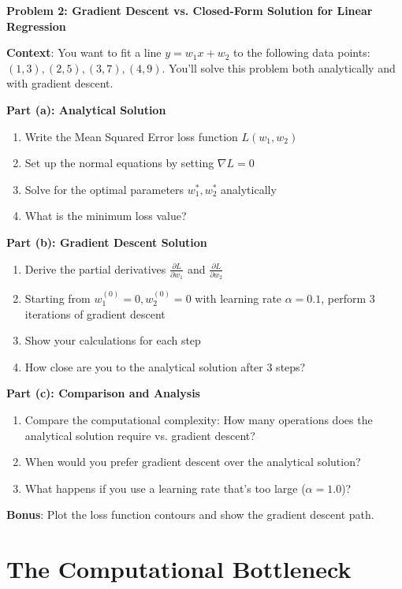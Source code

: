 \documentclass[11pt]{article}
\begin{document}
\begin{homeworkbox}
\textbf{Problem 2: Gradient Descent vs. Closed-Form Solution for Linear Regression}

\textbf{Context}: You want to fit a line $y = w_1 x + w_2$ to the following data points: $(1, 3), (2, 5), (3, 7), (4, 9)$. You'll solve this problem both analytically and with gradient descent.

\textbf{Part (a): Analytical Solution}
\begin{enumerate}
\item Write the Mean Squared Error loss function $L(w_1, w_2)$
\item Set up the normal equations by setting $\nabla L = 0$
\item Solve for the optimal parameters $w_1^*, w_2^*$ analytically
\item What is the minimum loss value?
\end{enumerate}

\textbf{Part (b): Gradient Descent Solution}
\begin{enumerate}
\item Derive the partial derivatives $\frac{\partial L}{\partial w_1}$ and $\frac{\partial L}{\partial w_2}$
\item Starting from $w_1^{(0)} = 0, w_2^{(0)} = 0$ with learning rate $\alpha = 0.1$, perform 3 iterations of gradient descent
\item Show your calculations for each step
\item How close are you to the analytical solution after 3 steps?
\end{enumerate}

\textbf{Part (c): Comparison and Analysis}
\begin{enumerate}
\item Compare the computational complexity: How many operations does the analytical solution require vs. gradient descent?
\item When would you prefer gradient descent over the analytical solution?
\item What happens if you use a learning rate that's too large ($\alpha = 1.0$)?
\end{enumerate}

\textbf{Bonus}: Plot the loss function contours and show the gradient descent path.
\end{homeworkbox}

\section{The Computational Bottleneck}
\end{document}

